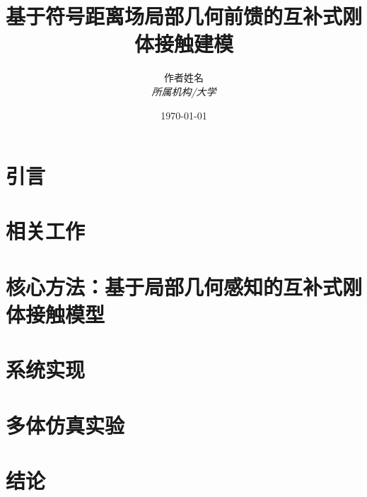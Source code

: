 \documentclass[12pt,a4paper]{article}
\title{\textbf{基于符号距离场局部几何前馈的互补式刚体接触建模}}
\author{作者姓名\\ \textit{所属机构/大学}}
\date{\today}
\begin{document}
\maketitle

\begin{abstract}

\end{abstract}

\section{引言}


\section{相关工作}


\section{核心方法：基于局部几何感知的互补式刚体接触模型}


\section{系统实现}


\section{多体仿真实验}


\section{结论}



\end{document}
